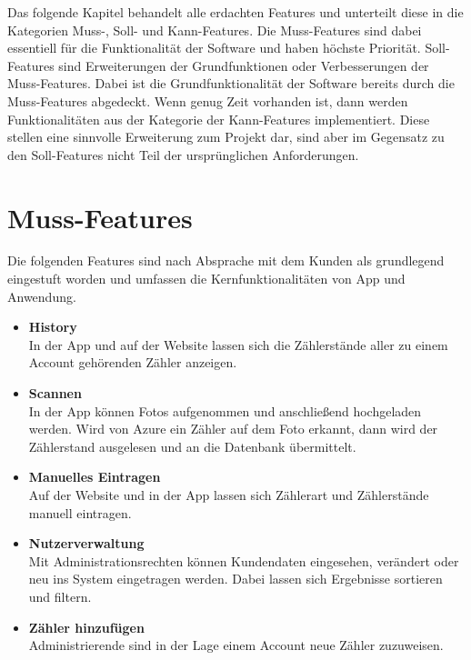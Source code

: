 
Das folgende Kapitel behandelt alle erdachten Features und unterteilt diese in die Kategorien Muss-, Soll- und Kann-Features. 
Die Muss-Features sind dabei essentiell für die Funktionalität der Software und haben höchste Priorität.
Soll-Features sind Erweiterungen der Grundfunktionen oder Verbesserungen der Muss-Features. Dabei ist die Grundfunktionalität der Software bereits durch die Muss-Features abgedeckt.
Wenn genug Zeit vorhanden ist, dann werden Funktionalitäten aus der Kategorie der Kann-Features implementiert. 
Diese stellen eine sinnvolle Erweiterung zum Projekt dar, sind aber im Gegensatz zu den Soll-Features nicht Teil der ursprünglichen Anforderungen.
\section{Muss-Features}
Die folgenden Features sind nach Absprache mit dem Kunden als grundlegend eingestuft worden und umfassen die Kernfunktionalitäten von App und Anwendung.
\begin{itemize}
\item \textbf{History} \hfill \\
	In der App und auf der Website lassen sich die Zählerstände aller zu einem Account gehörenden Zähler anzeigen.
\item \textbf{Scannen} \hfill \\
	In der App können Fotos aufgenommen und anschließend hochgeladen werden. 
	Wird von Azure ein Zähler auf dem Foto erkannt, dann wird der Zählerstand ausgelesen und an die Datenbank übermittelt.
\item \textbf{Manuelles Eintragen} \hfill \\
	Auf der Website und in der App lassen sich Zählerart und Zählerstände manuell eintragen.
\item \textbf{Nutzerverwaltung} \hfill \\
	Mit Administrationsrechten können Kundendaten eingesehen, verändert oder neu ins System eingetragen werden.
	Dabei lassen sich Ergebnisse sortieren und filtern.
\item \textbf{Zähler hinzufügen} \hfill \\
	Administrierende sind in der Lage einem Account neue Zähler zuzuweisen.	
\end{itemize}
\newpage
